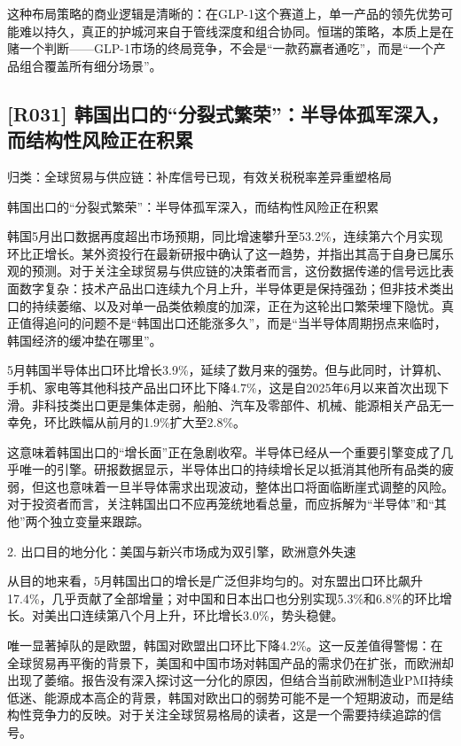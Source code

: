 \documentclass[11pt]{ctexart}
\begin{document}
这种布局策略的商业逻辑是清晰的：在GLP-1这个赛道上，单一产品的领先优势可能难以持久，真正的护城河来自于管线深度和组合协同。恒瑞的策略，本质上是在赌一个判断——GLP-1市场的终局竞争，不会是“一款药赢者通吃”，而是“一个产品组合覆盖所有细分场景”。

\subsection{[R031] 韩国出口的“分裂式繁荣”：半导体孤军深入，而结构性风险正在积累}
{\small\color{refgray}归类：全球贸易与供应链：补库信号已现，有效关税税率差异重塑格局}

韩国出口的“分裂式繁荣”：半导体孤军深入，而结构性风险正在积累

韩国5月出口数据再度超出市场预期，同比增速攀升至53.2\%，连续第六个月实现环比正增长。某外资投行在最新研报中确认了这一趋势，并指出其高于自身已属乐观的预测。对于关注全球贸易与供应链的决策者而言，这份数据传递的信号远比表面数字复杂：技术产品出口连续九个月上升，半导体更是保持强劲；但非技术类出口的持续萎缩、以及对单一品类依赖度的加深，正在为这轮出口繁荣埋下隐忧。真正值得追问的问题不是“韩国出口还能涨多久”，而是“当半导体周期拐点来临时，韩国经济的缓冲垫在哪里”。

5月韩国半导体出口环比增长3.9\%，延续了数月来的强势。但与此同时，计算机、手机、家电等其他科技产品出口环比下降4.7\%，这是自2025年6月以来首次出现下滑。非科技类出口更是集体走弱，船舶、汽车及零部件、机械、能源相关产品无一幸免，环比跌幅从前月的1.9\%扩大至2.8\%。

这意味着韩国出口的“增长面”正在急剧收窄。半导体已经从一个重要引擎变成了几乎唯一的引擎。研报数据显示，半导体出口的持续增长足以抵消其他所有品类的疲弱，但这也意味着一旦半导体需求出现波动，整体出口将面临断崖式调整的风险。对于投资者而言，关注韩国出口不应再笼统地看总量，而应拆解为“半导体”和“其他”两个独立变量来跟踪。

2. 出口目的地分化：美国与新兴市场成为双引擎，欧洲意外失速

从目的地来看，5月韩国出口的增长是广泛但非均匀的。对东盟出口环比飙升17.4\%，几乎贡献了全部增量；对中国和日本出口也分别实现5.3\%和6.8\%的环比增长。对美出口连续第八个月上升，环比增长3.0\%，势头稳健。

唯一显著掉队的是欧盟，韩国对欧盟出口环比下降4.2\%。这一反差值得警惕：在全球贸易再平衡的背景下，美国和中国市场对韩国产品的需求仍在扩张，而欧洲却出现了萎缩。报告没有深入探讨这一分化的原因，但结合当前欧洲制造业PMI持续低迷、能源成本高企的背景，韩国对欧出口的弱势可能不是一个短期波动，而是结构性竞争力的反映。对于关注全球贸易格局的读者，这是一个需要持续追踪的信号。
\end{document}
